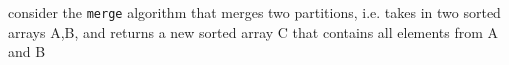 \documentclass[a4paper,12pt]{article}
\newcommand{\?}{\stackrel{?}{=}}
\begin{document}
\newenvironment{note}
  {\begin{bclogo}[logo=\bcinfo, couleurBarre=orange, couleur=lightgray]{ note}}
  {\end{bclogo}}
\newenvironment{attention}
  {\begin{bclogo}[logo=\bcattention, couleurBarre=red, noborder=true, 
                couleur=red!15]{Important!}}
  {\end{bclogo}}

consider the \texttt{merge} algorithm that merges two partitions, i.e. takes in two sorted arrays A,B, and returns a new sorted array C that contains all elements from A and B\\[0pt]

\end{document}
